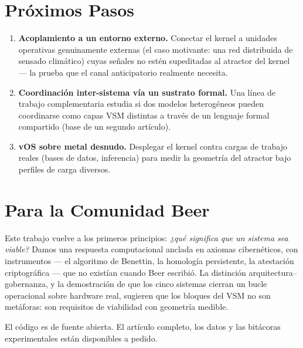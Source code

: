 \documentclass[11pt, a4paper]{article}
\newcommand{\vOS}{\textsf{vOS}}
\begin{document}
\section*{Próximos Pasos}

\begin{enumerate}
  \item \textbf{Acoplamiento a un entorno externo.} Conectar el kernel a unidades
        operativas genuinamente externas (el caso motivante: una red distribuida de
        sensado climático) cuyas señales no estén supeditadas al atractor del kernel
        --- la prueba que el canal anticipatorio realmente necesita.
  \item \textbf{Coordinación inter-sistema vía un sustrato formal.} Una línea de
        trabajo complementaria estudia si dos modelos heterogéneos pueden coordinarse
        como capas VSM distintas a través de un lenguaje formal compartido (base de un
        segundo artículo).
  \item \textbf{\vOS{} sobre metal desnudo.} Desplegar el kernel contra cargas de
        trabajo reales (bases de datos, inferencia) para medir la geometría del
        atractor bajo perfiles de carga diversos.
\end{enumerate}

\section*{Para la Comunidad Beer}

Este trabajo vuelve a los primeros principios: \emph{¿qué significa que un sistema sea
viable?} Damos una respuesta computacional anclada en axiomas cibernéticos, con
instrumentos --- el algoritmo de Benettin, la homología persistente, la atestación
criptográfica --- que no existían cuando Beer escribió. La distinción
arquitectura--gobernanza, y la demostración de que los cinco sistemas cierran un bucle
operacional sobre hardware real, sugieren que los bloques del VSM no son metáforas: son
requisitos de viabilidad con geometría medible.

El código es de fuente abierta. El artículo completo, los datos y las bitácoras
experimentales están disponibles a pedido.
\end{document}
